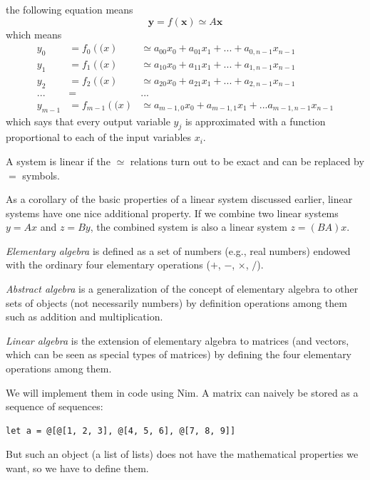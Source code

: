 \documentclass[justified, sixbynine]{tufte-book}
\theoremstyle{plain}%
\newtheorem * {corollary}{Corollary}
\theoremstyle{definition}
\theoremstyle{remark}
\newtheorem * {remark}{Remark}
\newtheorem * {note}{Note}
\begin{document}
\begin{fullwidth}
the following equation means
\begin{equation}
\mathbf{y} = f(\mathbf{x}) \simeq A \mathbf{x}
\end{equation}
which means
\begin{eqnarray}
y_0 &= f_0(\mathbf(x) &\simeq a_{00} x_0 + a_{01} x_1 + ... + a_{0, n-1}x_{n-1} \\
y_1 &= f_1(\mathbf(x) &\simeq a_{10} x_0 + a_{11} x_1 + ... + a_{1, n-1}x_{n-1} \\
y_2 &= f_2(\mathbf(x) &\simeq a_{20} x_0 + a_{21} x_1 + ... + a_{2, n-1}x_{n-1} \\
... &=& ... \\
y_{m-1} &= f_{m-1}(\mathbf(x) &\simeq a_{m-1, 0} x_0 + a_{m-1, 1} x_1 + ...
a_{m-1, n-1}x_{n-1}
\end{eqnarray}
which says that every output variable $y_j$ is approximated with a function proportional to each of the input variables $x_i$.

A system is linear if the $\simeq$ relations turn out to be exact and can be replaced by $=$ symbols.

As a corollary of the basic properties of a linear system discussed earlier, linear systems have one nice additional property. If we combine two linear systems $y=Ax$ and $z=By$, the combined system is also a linear system $z = (BA)x$.


{\it Elementary algebra} is defined as a set of numbers (e.g., real numbers) endowed with the ordinary four elementary operations ($+$, $-$, $\times$, $/$).

{\it Abstract algebra} is a generalization of the concept of elementary algebra to other sets of objects (not necessarily numbers) by definition operations among them such as addition and multiplication.

{\it Linear algebra} is the extension of elementary algebra to matrices (and vectors, which can be seen as special types of matrices) by defining the four elementary operations among them.

We will implement them in code using Nim.
A matrix can naively be stored as a sequence of sequences:
\begin{lstlisting}
let a = @[@[1, 2, 3], @[4, 5, 6], @[7, 8, 9]]
\end{lstlisting}
But such an object (a list of lists) does not have the mathematical properties we want, so we have to define them.


\end{fullwidth}
\end{document}

